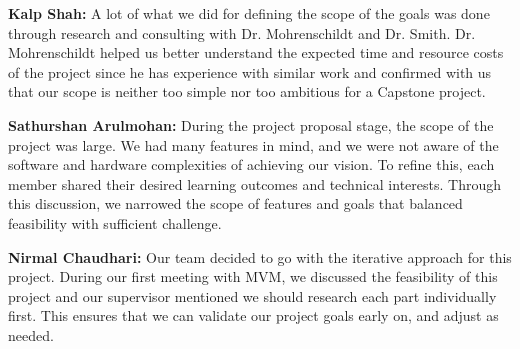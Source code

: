 \documentclass{article}
\begin{document}
\begin{enumerate}
    \textbf{Kalp Shah:} A lot of what we did for defining the scope of the goals
    was done through research and consulting with Dr. Mohrenschildt and Dr.
    Smith. Dr. Mohrenschildt helped us better understand the expected time and
    resource costs of the project since he has experience with similar work and
    confirmed with us that our scope is neither too simple nor too ambitious for
    a Capstone project.

    \textbf{Sathurshan Arulmohan:} During the project proposal stage, the scope
    of the project was large. We had many features in mind, and we were not
    aware of the software and hardware complexities of achieving our vision. To
    refine this, each member shared their desired learning outcomes and
    technical interests. Through this discussion, we narrowed the scope of
    features and goals that balanced feasibility with sufficient challenge.

    \textbf{Nirmal Chaudhari:} Our team decided to go with the iterative
    approach for this project. During our first meeting with MVM, we discussed
    the feasibility of this project and our supervisor mentioned we should
    research each part individually first. This ensures that we can validate our
    project goals early on, and adjust as needed. 

\end{enumerate}  

\newpage{}



\end{document}
